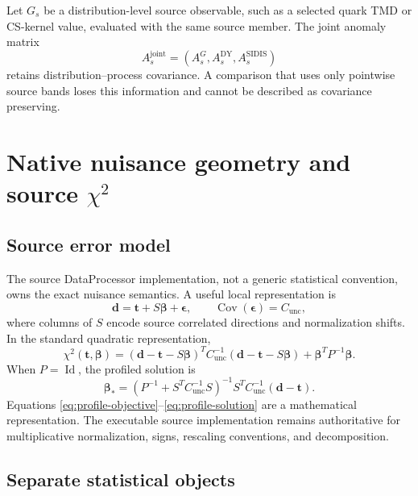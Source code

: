 \documentclass[11pt]{article}
\newcommand{\Id}{\operatorname{Id}}
\newcommand{\Cov}{\operatorname{Cov}}
\newcommand{\DY}{\ensuremath{\mathrm{DY}}}
\newcommand{\SIDIS}{\ensuremath{\mathrm{SIDIS}}}
\begin{document}
Let \(G_s\) be a distribution-level source observable, such as a selected quark TMD or CS-kernel value, evaluated with the same source member.  The joint anomaly matrix
\begin{equation}
 A_s^{\mathrm{joint}}
 =
 \left(
 A_s^{G},
 A_s^{\DY},
 A_s^{\SIDIS}
 \right)
 \label{eq:joint-anomaly}
\end{equation}
retains distribution--process covariance.  A comparison that uses only pointwise source bands loses this information and cannot be described as covariance preserving.

\section{Native nuisance geometry and source \texorpdfstring{\(\chi^2\)}{chi2}}
\label{sec:nuisance}

\subsection{Source error model}

The source DataProcessor implementation, not a generic statistical convention, owns the exact nuisance semantics.  A useful local representation is
\begin{equation}
 \bm d
 =
 \bm t
 +S\bm\beta
 +\bm\epsilon,
 \qquad
 \Cov(\bm\epsilon)=C_{\mathrm{unc}},
 \label{eq:nuisance-model}
\end{equation}
where columns of \(S\) encode source correlated directions and normalization shifts.  In the standard quadratic representation,
\begin{equation}
 \chi^2(\bm t,\bm\beta)
 =
 (\bm d-\bm t-S\bm\beta)^T
 C_{\mathrm{unc}}^{-1}
 (\bm d-\bm t-S\bm\beta)
 +\bm\beta^T P^{-1}\bm\beta.
 \label{eq:profile-objective}
\end{equation}
When \(P=\Id\), the profiled solution is
\begin{equation}
 \bm\beta_*
 =
 \left(P^{-1}+S^TC_{\mathrm{unc}}^{-1}S\right)^{-1}
 S^TC_{\mathrm{unc}}^{-1}(\bm d-\bm t).
 \label{eq:profile-solution}
\end{equation}
Equations \eqref{eq:profile-objective}--\eqref{eq:profile-solution} are a mathematical representation.  The executable source implementation remains authoritative for multiplicative normalization, signs, rescaling conventions, and decomposition.

\subsection{Separate statistical objects}
\end{document}
